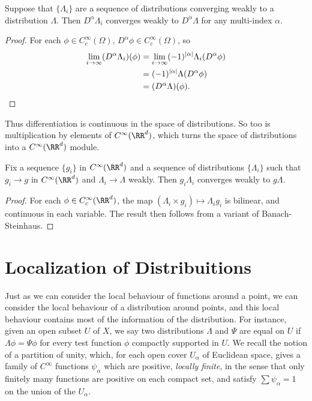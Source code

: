 \begin{theorem}
  Suppose that $\{ \Lambda_i \}$ are a sequence of distributions converging weakly to a distribution $\Lambda$. Then $D^\alpha \Lambda_i$ converges weakly to $D^\alpha \Lambda$ for any multi-index $\alpha$.
\end{theorem}
\begin{proof}
  For each $\phi \in C_c^\infty(\Omega)$, $D^\alpha \phi \in C_c^\infty(\Omega)$, so
  \begin{align*}
    \lim_{i \to \infty} (D^\alpha \Lambda_i)(\phi) &= \lim_{i \to \infty} (-1)^{|\alpha|} \Lambda_i(D^\alpha \phi)\\
    &= (-1)^{|\alpha|} \Lambda(D^\alpha \phi)\\
    &= (D^\alpha \Lambda)(\phi). \qedhere
  \end{align*}
\end{proof}

Thus differentiation is continuous in the space of distributions. So too is multiplication by elements of $C^\infty(\RR^d)$, which turns the space of distributions into a $C^\infty(\RR^d)$ module.

\begin{theorem}
  Fix a sequence $\{ g_i \}$ in $C^\infty(\RR^d)$ and a sequence of distributions $\{ \Lambda_i \}$ such that $g_i \to g$ in $C^\infty(\RR^d)$ and $\Lambda_i \to \Lambda$ weakly. Then $g_i \Lambda_i$ converges weakly to $g \Lambda$.
\end{theorem}
\begin{proof}
  For each $\phi \in C_c^\infty(\RR^d)$, the map $(\Lambda_i \times g_i) \mapsto \Lambda_i g_i$ is bilinear, and continuous in each variable. The result then follows from a variant of Banach-Steinhaus.
\end{proof}

\section{Localization of Distribuitions}

Just as we can consider the local behaviour of functions around a point, we can consider the local behaviour of a distribution around points, and this local behaviour contains most of the information of the distribution. For instance, given an open subset $U$ of $X$, we say two distributions $\Lambda$ and $\Psi$ are equal on $U$ if $\Lambda \phi = \Psi \phi$ for every test function $\phi$ compactly supported in $U$. We recall the notion of a partition of unity, which, for each open cover $U_\alpha$ of Euclidean space, gives a family of $C^\infty$ functions $\psi_\alpha$ which are positive, {\it locally finite}, in the sense that only finitely many functions are positive on each compact set, and satisfy $\sum \psi_\alpha = 1$ on the union of the $U_\alpha$.

